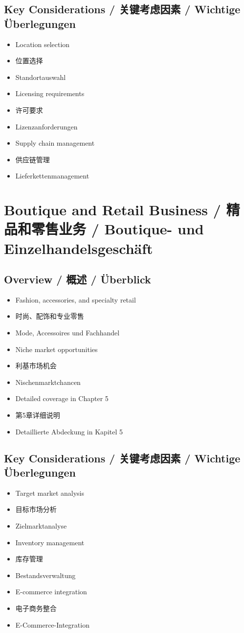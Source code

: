 \subsection{Key Considerations / 关键考虑因素 / Wichtige Überlegungen}
\begin{itemize}
    \item Location selection
    \item 位置选择
    \item Standortauswahl
    \item Licensing requirements
    \item 许可要求
    \item Lizenzanforderungen
    \item Supply chain management
    \item 供应链管理
    \item Lieferkettenmanagement
\end{itemize}

\section{Boutique and Retail Business / 精品和零售业务 / Boutique- und Einzelhandelsgeschäft}

\subsection{Overview / 概述 / Überblick}
\begin{itemize}
    \item Fashion, accessories, and specialty retail
    \item 时尚、配饰和专业零售
    \item Mode, Accessoires und Fachhandel
    \item Niche market opportunities
    \item 利基市场机会
    \item Nischenmarktchancen
    \item Detailed coverage in Chapter 5
    \item 第5章详细说明
    \item Detaillierte Abdeckung in Kapitel 5
\end{itemize}

\subsection{Key Considerations / 关键考虑因素 / Wichtige Überlegungen}
\begin{itemize}
    \item Target market analysis
    \item 目标市场分析
    \item Zielmarktanalyse
    \item Inventory management
    \item 库存管理
    \item Bestandsverwaltung
    \item E-commerce integration
    \item 电子商务整合
    \item E-Commerce-Integration
\end{itemize}

